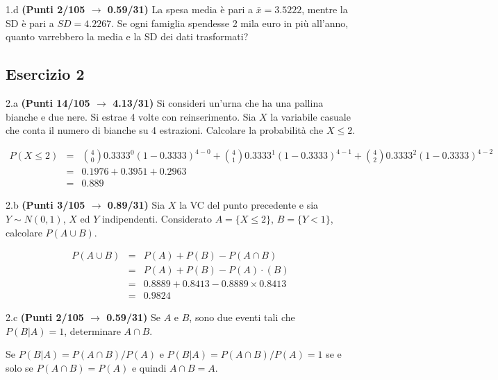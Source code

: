 \documentclass[
  11pt,
]{book}
\theoremstyle{mytheoremstyle}
\theoremstyle{mydefstyle}
\newenvironment{sol}
  {
  \begin{tcolorbox}[enhanced,breakable,arc=0.1mm,boxrule=1pt,colback=white,colframe=iblue,
  title=\bf \fontfamily{lmss}\selectfont \hspace{.5 cm} Soluzione,drop fuzzy shadow]

}{
\end{tcolorbox}
  }
\begin{document}
1.d \textbf{(Punti 2/105 \(\rightarrow\) 0.59/31)} La spesa media è pari a \(\bar x=3.5222\), mentre la SD è pari a \(SD=4.2267\).
Se ogni famiglia spendesse 2 mila euro in più all'anno, quanto varrebbero la media e la SD dei dati trasformati?

\subsection{Esercizio 2}\label{esercizio-2-37}

2.a \textbf{(Punti 14/105 \(\rightarrow\) 4.13/31)} Si consideri un'urna che ha una pallina bianche e due nere. Si estrae 4 volte con reinserimento. Sia \(X\) la variabile casuale che conta il numero di bianche su 4 estrazioni. Calcolare la probabilità che \(X\leq 2\).

\begin{sol}
\normalsize 
\begin{eqnarray*}
      P( X \leq 2 ) &=& \binom{ 4 }{ 0 } 0.3333 ^{ 0 }(1- 0.3333 )^{ 4 - 0 }+\binom{ 4 }{ 1 } 0.3333 ^{ 1 }(1- 0.3333 )^{ 4 - 1 }+\binom{ 4 }{ 2 } 0.3333 ^{ 2 }(1- 0.3333 )^{ 4 - 2 } \\                 &=& 0.1976+0.3951+0.2963 \\                 &=& 0.889 
   \end{eqnarray*}
\normalsize 

\end{sol}

2.b \textbf{(Punti 3/105 \(\rightarrow\) 0.89/31)} Sia \(X\) la VC del punto precedente e sia \(Y\sim N(0,1)\), \(X\) ed \(Y\) indipendenti. Considerato \(A=\{X\leq 2\}\), \(B=\{Y<1\}\), calcolare \(P(A\cup B)\).

\begin{sol}
\begin{eqnarray}
      P( A \cup B ) &=& P( A )+P( B )-P( A \cap B ) \\
                         &=& P( A )+P( B )-P( A )\cdot ( B ) \\
                         &=&  0.8889 + 0.8413 - 0.8889 \times 0.8413  \\
                         &=&  0.9824 \end{eqnarray}

\end{sol}

2.c \textbf{(Punti 2/105 \(\rightarrow\) 0.59/31)} Se \(A\) e \(B\), sono due eventi tali che \(P(B|A)=1\), determinare \(A\cap B\).

\begin{sol}
Se \(P(B|A)=P(A\cap B)/P(A)\) e \(P(B|A)=P(A\cap B)/P(A)=1\) se e solo se \(P(A\cap B)=P(A)\) e quindi \(A\cap B = A\).

\end{sol}
\end{document}
